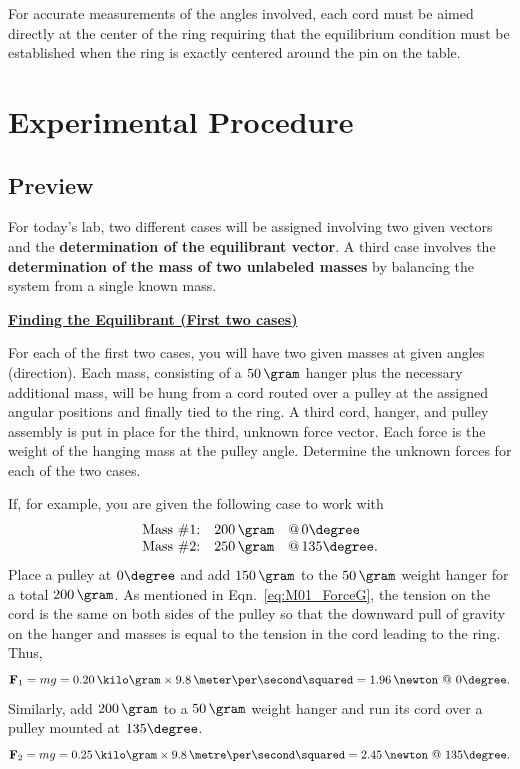 For accurate measurements of the angles involved, each cord must be aimed directly at the center of the ring requiring that the equilibrium condition must be established when the ring is exactly centered around the pin on the table.



\section{Experimental Procedure}

\subsection{Preview}

For today's lab, two different cases will be assigned involving two given vectors and the \textbf{determination of the equilibrant vector}. A third case involves the \textbf{determination of the mass of two unlabeled masses} by balancing the system from a single known mass.%

\underline{\textbf{Finding the Equilibrant (First two cases)}}


For each of the first two cases, you will have two given masses at given angles (direction).  Each mass, consisting of a $50\,\gram$ hanger plus the necessary additional mass, will be hung from a cord routed over a pulley at the assigned angular positions and finally tied to the ring.  A third cord, hanger, and pulley assembly is put in place for the third, unknown force vector.  Each force is the weight of the hanging mass at the pulley angle.  Determine the unknown forces for each of the two cases. %

If, for example, you are given the following case to work with
\[
\begin{array}{rll}
  \mbox{Mass \#1:} & 200\,\gram & \mbox{@}\,0\degree \\
  \mbox{Mass \#2:} & 250\,\gram & \mbox{@}\,135\degree.
\end{array}
\]
Place a pulley at $0\degree$ and add $150\,\gram$ to the $50\,\gram$ weight hanger for a total $200\,\gram$.  As mentioned in Eqn.~\ref{eq:M01_ForceG}, the tension on the cord is the same on both sides of the pulley so that the downward pull of gravity on the hanger and masses is equal to the tension in the cord leading to the ring.  Thus,
\[
\vec{F}_1 = m g = 0.20\,\kilo\gram\times 9.8\,\meter\per\second\squared
         = 1.96\,\newton\ @\ 0\degree.
\]
Similarly, add $200\,\gram$ to a $50\,\gram$ weight hanger and run its cord over a pulley mounted at $135\degree$.
\[
\vec{F}_2 = m g = 0.25\,\kilo\gram\times 9.8\,\metre\per\second\squared
         = 2.45\,\newton\ @ \ 135\degree.
\]

